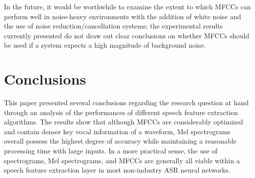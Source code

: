 \par
In the future, it would be worthwhile to examine the extent to which MFCCs can perform well in noise-heavy environments with the addition of white noise and the use of noise reduction/cancellation systems; the experimental results currently presented do not draw out clear conclusions on whether MFCCs should be used if a system expects a high magnitude of background noise.


\section{Conclusions}

This paper presented several conclusions regarding the research question at hand through an analysis of the performances of different speech feature extraction algorithms. The results show that although MFCCs are considerably optimized and contain denser key vocal information of a waveform, Mel spectrograms overall possess the highest degree of accuracy while maintaining a reasonable processing time with large inputs. In a more practical sense, the use of spectrograms, Mel spectrograms, and MFCCs are generally all viable within a speech feature extraction layer in most non-industry ASR neural networks.